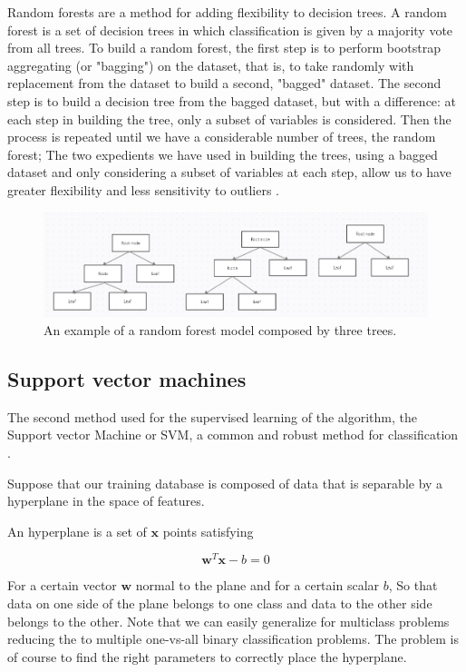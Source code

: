 \documentclass[a4paper]{report}
\begin{document}
Random forests are a method for adding flexibility to decision trees.
A random forest is a set of decision trees in which classification is given by a majority vote from all trees.
To build a random forest, the first step is to perform bootstrap aggregating (or "bagging") on the dataset, that is, to take randomly with replacement from the dataset to build a second, "bagged" dataset.
The second step is to build a decision tree from the bagged dataset, but with a difference:
at each step in building the tree, only a subset of variables is considered.
Then the process is repeated until we have a considerable number of trees, the random forest;
The two expedients we have used in building the trees, using a bagged dataset and only considering a subset of variables at each step, allow us to have greater flexibility and less sensitivity to outliers \cite{hastie2001data}.

\begin{figure} [H]
	\centering
	\includegraphics [width=\textwidth ] {o/forest.png}
	\caption{An example of a random forest model composed by three trees.}
	\label{forest}
\end{figure}



\subsection{Support vector machines}

The second method used for the supervised learning of the algorithm, the Support vector Machine or SVM, a common and robust method for classification
\cite{gunn1998support}.

Suppose that our training database is composed of data that is separable by a hyperplane in the space of features.

An hyperplane is a set of $\textbf{x}$ points satisfying

\begin{equation}
	\textbf{w}^T\textbf{x} -b = 0
\end{equation}

For a certain vector $\textbf{w}$ normal to the plane and for a certain scalar $b$, So that data on one side of the plane belongs to one class and data to the other side belongs to the other.
Note that we can easily generalize for multiclass problems reducing the to multiple one-vs-all binary classification problems.
The problem is of course to find the right parameters to correctly place the hyperplane.
\end{document}

